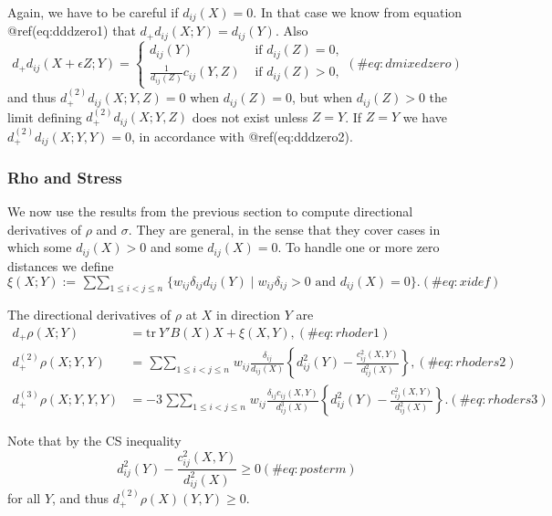 \documentclass[
  12pt,
  letterpaper,
  DIV=11,
  numbers=noendperiod]{scrreprt}
\theoremstyle{remark}
\begin{document}
Again, we have to be careful if \(d_{ij}(X)=0\). In that case we know
from equation @ref(eq:dddzero1) that \(d_+d_{ij}(X;Y)=d_{ij}(Y)\). Also
\begin{equation}
d_+d_{ij}(X+\epsilon Z;Y)=\begin{cases}d_{ij}(Y)&\text{ if }d_{ij}(Z)=0,\\
\frac{1}{d_{ij}(Z)}c_{ij}(Y,Z)&\text{ if }d_{ij}(Z)>0,
\end{cases}
(\#eq:dmixedzero)
\end{equation} and thus \(d_+^{(2)}d_{ij}(X;Y,Z)=0\) when
\(d_{ij}(Z)=0\), but when \(d_{ij}(Z)>0\) the limit defining
\(d_+^{(2)}d_{ij}(X;Y,Z)\) does not exist unless \(Z=Y\). If \(Z=Y\) we
have \(d_+^{(2)}d_{ij}(X;Y,Y)=0\), in accordance with @ref(eq:dddzero2).

\subsubsection{Rho and Stress}\label{secrhostress}

We now use the results from the previous section to compute directional
derivatives of \(\rho\) and \(\sigma\). They are general, in the sense
that they cover cases in which some \(d_{ij}(X)>0\) and some
\(d_{ij}(X)=0\). To handle one or more zero distances we define
\begin{equation}
\xi(X;Y):=\mathop{\sum\sum}_{1\leq i<j\leq n}\{w_{ij}\delta_{ij}d_{ij}(Y)\mid w_{ij}\delta_{ij}>0\text{ and }d_{ij}(X)=0\}.
(\#eq:xidef)
\end{equation}

The directional derivatives of \(\rho\) at \(X\) in direction \(Y\) are
\begin{align}
d_+\rho(X;Y)&=\text{tr}\ Y'B(X)X+\xi(X,Y),(\#eq:rhoder1)\\
d_+^{(2)}\rho(X;Y,Y)&=\mathop{\sum\sum}_{1\leq i<j\leq n}w_{ij}\frac{\delta_{ij}}{d_{ij}(X)}\left\{d_{ij}^2(Y)-\frac{c_{ij}^2(X,Y)}
{d_{ij}^2(X)}\right\},(\#eq:rhoders2)\\
d_+^{(3)}\rho(X;Y,Y,Y)&=-3\mathop{\sum\sum}_{1\leq i<j\leq n}w_{ij}\frac{\delta_{ij}c_{ij}(X,Y)}{d_{ij}^3(X)}\left\{d_{ij}^2(Y)-\frac{c_{ij}^2(X,Y)}{d_{ij}^2(X)}\right\}.(\#eq:rhoders3)
\end{align}

Note that by the CS inequality \begin{equation}
d_{ij}^2(Y)-\frac{c_{ij}^2(X,Y)}{d_{ij}^2(X)}\geq 0
(\#eq:posterm)
\end{equation} for all \(Y\), and thus \(d_+^{(2)}\rho(X)(Y,Y)\geq 0\).
\end{document}
